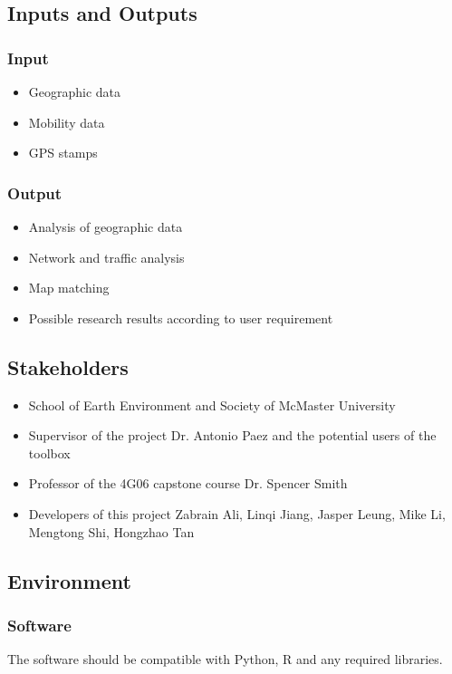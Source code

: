 \documentclass{article}
\begin{document}
\subsection{Inputs and Outputs}
    \subsubsection{Input}
    \begin{itemize}
    \item Geographic data
    \item Mobility data
    \item GPS stamps
    \end{itemize}
    \subsubsection{Output}
    \begin{itemize}
    \item Analysis of geographic data
    \item Network and traffic analysis
    \item Map matching
    \item Possible research results according to user requirement
    \end{itemize}

\subsection{Stakeholders}

\begin{itemize}
    \item School of Earth Environment and Society of McMaster University
    \item Supervisor of the project Dr. Antonio Paez and the potential users of the toolbox
    \item Professor of the 4G06 capstone course Dr. Spencer Smith
    \item Developers of this project Zabrain Ali, Linqi Jiang, Jasper Leung, Mike Li,  Mengtong Shi, Hongzhao Tan
\end{itemize}

\subsection{Environment}
    \subsubsection{Software}
    The software should be compatible with Python, R and any required libraries.
    
\end{document}
